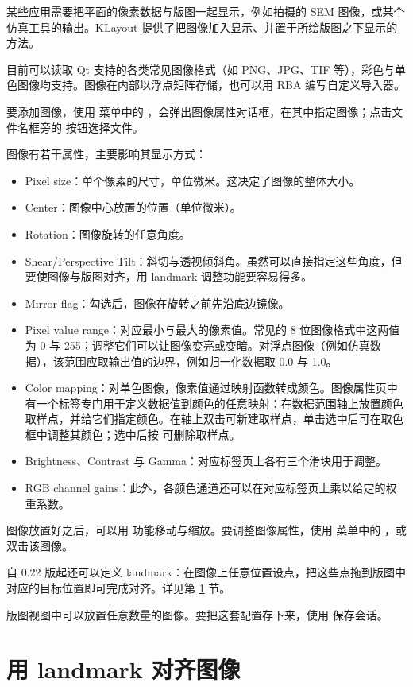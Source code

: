 某些应用需要把平面的像素数据与版图一起显示，例如拍摄的 SEM 图像，或某个仿真工具的输出。KLayout 提供了把图像加入显示、并置于所绘版图之下显示的方法。

目前可以读取 Qt 支持的各类常见图像格式（如 PNG、JPG、TIF 等），彩色与单色图像均支持。图像在内部以浮点矩阵存储，也可以用 RBA 编写自定义导入器。

要添加图像，使用  菜单中的 ，会弹出图像属性对话框，在其中指定图像；点击文件名框旁的  按钮选择文件。

图像有若干属性，主要影响其显示方式：

\begin{itemize}
\item Pixel size：单个像素的尺寸，单位微米。这决定了图像的整体大小。
\item Center：图像中心放置的位置（单位微米）。
\item Rotation：图像旋转的任意角度。
\item Shear/Perspective Tilt：斜切与透视倾斜角。虽然可以直接指定这些角度，但要使图像与版图对齐，用 landmark 调整功能要容易得多。
\item Mirror flag：勾选后，图像在旋转之前先沿底边镜像。
\item Pixel value range：对应最小与最大的像素值。常见的 8 位图像格式中这两值为 0 与 255；调整它们可以让图像变亮或变暗。对浮点图像（例如仿真数据），该范围应取输出值的边界，例如归一化数据取 0.0 与 1.0。
\item Color mapping：对单色图像，像素值通过映射函数转成颜色。图像属性页中有一个标签专门用于定义数据值到颜色的任意映射：在数据范围轴上放置颜色取样点，并给它们指定颜色。在轴上双击可新建取样点，单击选中后可在取色框中调整其颜色；选中后按  可删除取样点。
\item Brightness、Contrast 与 Gamma：对应标签页上各有三个滑块用于调整。
\item RGB channel gains：此外，各颜色通道还可以在对应标签页上乘以给定的权重系数。
\end{itemize}

图像放置好之后，可以用  功能移动与缩放。要调整图像属性，使用  菜单中的 ，或双击该图像。

自 0.22 版起还可以定义 landmark：在图像上任意位置设点，把这些点拖到版图中对应的目标位置即可完成对齐。详见第 \ref{sec:landmarks} 节。

版图视图中可以放置任意数量的图像。要把这套配置存下来，使用  保存会话。

\section{用 landmark 对齐图像}\label{sec:landmarks}

